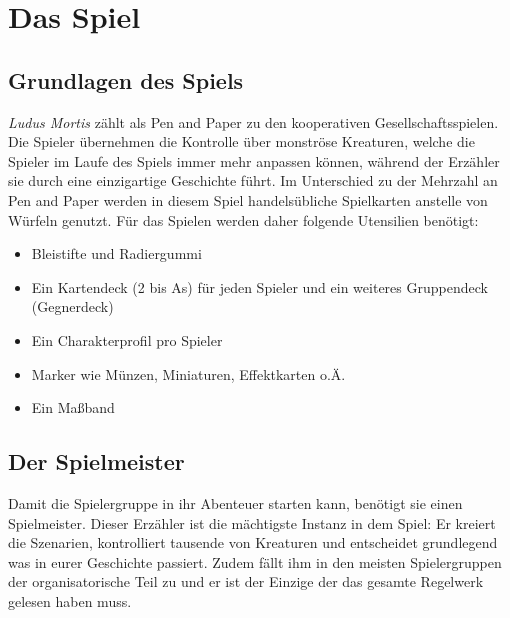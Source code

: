 \chapter{Das Spiel}
\section{Grundlagen des Spiels}
	
    \textit{Ludus Mortis} zählt als Pen and Paper zu den kooperativen Gesellschaftsspielen. Die Spieler übernehmen die Kontrolle über monströse Kreaturen, welche die Spieler im Laufe des Spiels immer mehr anpassen können, während der Erzähler sie durch eine einzigartige Geschichte führt. Im Unterschied zu der Mehrzahl an Pen and Paper werden in diesem Spiel handelsübliche Spielkarten anstelle von Würfeln genutzt. Für das Spielen werden daher folgende Utensilien benötigt:

    \begin{itemize}
	    \item Bleistifte und Radiergummi
	    \item Ein Kartendeck (2 bis As) für jeden Spieler und ein weiteres Gruppendeck (Gegnerdeck)
	    \item Ein Charakterprofil pro Spieler
	    \item Marker wie Münzen, Miniaturen, Effektkarten o.Ä.
	    \item Ein Maßband
    \end{itemize}
	
	
\section{Der Spielmeister}
    Damit die Spielergruppe in ihr Abenteuer starten kann, benötigt sie einen Spielmeister. Dieser Erzähler ist die mächtigste Instanz in dem Spiel: Er kreiert die Szenarien, kontrolliert tausende von Kreaturen und entscheidet grundlegend was in eurer Geschichte passiert. Zudem fällt ihm in den meisten Spielergruppen der organisatorische Teil zu und er ist der Einzige der das gesamte Regelwerk gelesen haben muss.
    

